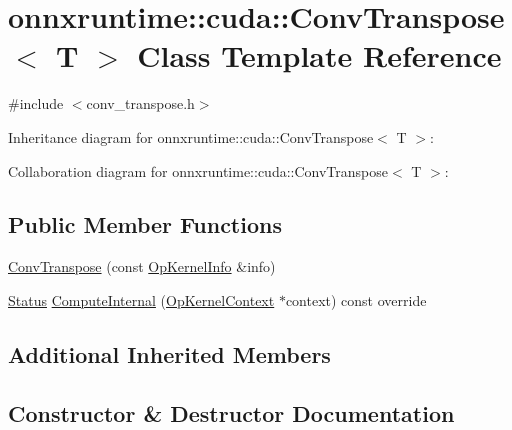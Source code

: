 \hypertarget{classonnxruntime_1_1cuda_1_1ConvTranspose}{}\section{onnxruntime\+:\+:cuda\+:\+:Conv\+Transpose$<$ T $>$ Class Template Reference}
\label{classonnxruntime_1_1cuda_1_1ConvTranspose}


{\ttfamily \#include $<$conv\+\_\+transpose.\+h$>$}



Inheritance diagram for onnxruntime\+:\+:cuda\+:\+:Conv\+Transpose$<$ T $>$\+:


Collaboration diagram for onnxruntime\+:\+:cuda\+:\+:Conv\+Transpose$<$ T $>$\+:
\subsection*{Public Member Functions}
\begin{DoxyCompactItemize}
\item 
\mbox{\hyperlink{classonnxruntime_1_1cuda_1_1ConvTranspose_a6851b9b291ad0d1c6973efd3fc1bccd6}{Conv\+Transpose}} (const \mbox{\hyperlink{classonnxruntime_1_1OpKernelInfo}{Op\+Kernel\+Info}} \&info)
\item 
\mbox{\hyperlink{classonnxruntime_1_1common_1_1Status}{Status}} \mbox{\hyperlink{classonnxruntime_1_1cuda_1_1ConvTranspose_a90953955a478cce3bc4e2992cb0e32d8}{Compute\+Internal}} (\mbox{\hyperlink{classonnxruntime_1_1OpKernelContext}{Op\+Kernel\+Context}} $\ast$context) const override
\end{DoxyCompactItemize}
\subsection*{Additional Inherited Members}


\subsection{Constructor \& Destructor Documentation}
\mbox{\label{classonnxruntime_1_1cuda_1_1ConvTranspose_a6851b9b291ad0d1c6973efd3fc1bccd6}} 
